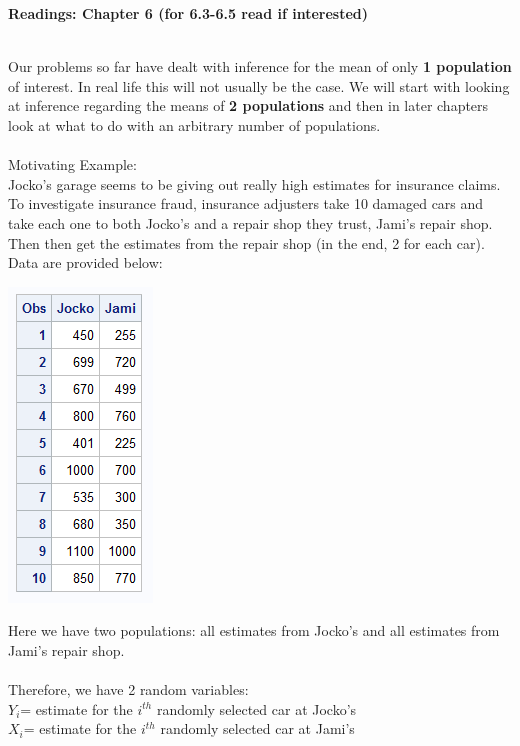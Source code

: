 \begin{center}\large\textbf{Readings: Chapter 6 (for 6.3-6.5 read if interested)}\\
\normalsize \end{center}
\large ~\hrulefill
~\\

Our problems so far have dealt with inference for the mean of only \textbf{1 population} of interest.  In real life this will not usually be the case.  We will start with looking at inference regarding the means of \textbf{2 populations} and then in later chapters look at what to do with an arbitrary number of populations.\\~\\

Motivating Example:\\
Jocko's garage seems to be giving out really high estimates for insurance claims.  To investigate insurance fraud, insurance adjusters take 10 damaged cars and take each one to both Jocko's and a repair shop they trust, Jami's repair shop.  Then then get the estimates from the repair shop (in the end, 2 for each car).  Data are provided below: 
\begin{center}
\includegraphics[scale=0.6]{autodata}
\end{center}
Here we have two populations: all estimates from Jocko's and all estimates from Jami's repair shop.\\~\\
Therefore, we have 2 random variables: \\
$Y_i$= estimate for the $i^{th}$ randomly selected car at Jocko's\\
$X_i$= estimate for the $i^{th}$ randomly selected car at Jami's\\~\\

